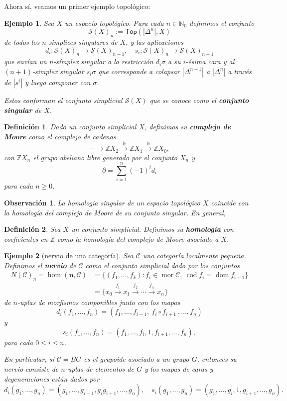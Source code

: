 \documentclass[11pt]{report}
\theoremstyle{colored}
\newtheorem{definition}{Definición}[section]
\newtheorem{remark}{Observación}[section]
\newtheorem{example}{Ejemplo}[section]
\newcommand{\N}{\mathbb{N}}
\newcommand{\Z}{\mathbb{Z}}
\newcommand{\cat}[1]{\mathsf{#1}}
\renewcommand{\ss}[1]{\Delta^{#1}}
\begin{document}
Ahora sí, veamos un primer ejemplo topológico:

\begin{example} Sea $X$ un espacio topológico. Para cada $n \in \N_0$ definimos el conjunto
\[
\mathcal{S}(X)_n := \cat{Top}(|\ss{n}|,X)
\]
de todos los $n$-simplices singulares de $X$, y las aplicaciones 
\[
d_i : \mathcal{S}(X)_n \to \mathcal{S}(X)_{n-1}, \quad
s_i : \mathcal{S}(X)_n \to \mathcal{S}(X)_{n+1}
\]
que envían un $n$-símplex singular a la restricción $d_i\sigma$ a su $i$-ésima cara y al $(n+1)$-simplex singular $s_i\sigma$ que corresponde a colapsar $|\ss{n+1}|$ a $|\ss{n}|$ a través de $|s^i|$ y luego componer con $\sigma$.

Estos conforman el conjunto simplicial $\mathcal{S}(X)$ que se conoce como el \textbf{conjunto singular} de $X$.
\end{example}

\begin{definition} Dado un conjunto simplicial $X$, definimos su \textbf{complejo de Moore} como el complejo de cadenas
\[
\cdots \to \Z X_2 \xrightarrow{\partial} \Z X_1 \xrightarrow{\partial} \Z X_0,
\]
con $\Z X_n$ el grupo abeliano libre generado por el conjunto $X_n$ y 
\[
\partial = \sum_{i=1}^n(-1)^i d_i
\]
para cada $n \geq 0$.
\end{definition}

\begin{remark} La homología singular de un espacio topológico $X$ coincide con la homología del complejo de Moore de su conjunto singular. En general,
\end{remark}

\begin{definition} Sea $X$ un conjunto simplicial. Definimos su \textbf{homología} con coeficientes en $\Z$ como la homología del complejo de Moore asociado a $X$.
\end{definition}

\begin{example}[nervio de una categoría] Sea $\mathscr{C}$ una categoría localmente pequeña. Definimos el \textbf{nervio} de  $\mathscr{C}$ como el conjunto simplicial dado por los conjuntos
\begin{align*}
N(\mathscr{C})_n = \hom(\mathbf{n},\mathscr{C}) &= \{(f_1,\dots, f_k) : f_i \in \operatorname{mor} \mathscr{C}, \ \operatorname{cod} f_i = \operatorname{dom}f_{i+1}\}\\
& = \{x_0 \xrightarrow{f_1} x_1 \xrightarrow{f_2} \cdots \xrightarrow{f_n} x_n\}
\end{align*}
de $n$-uplas de morfismos componibles junto con los mapas 
\[
d_i(f_1, \dots, f_n) = (f_1, \dots,f_{i-1}, \ f_i \circ f_{i+1} \ ,\dots,f_n)
\]
y
\[
s_i(f_1, \dots, f_n) = (f_1, \dots, f_i, 1, f_{i+1},\dots,f_n),
\]
para cada $0 \leq i \leq n$. 

En particular, si $\mathscr{C} = BG$ es el grupoide asociado a un grupo $G$, entonces su nervio consiste de $n$-uplas de elementos de $G$ y los mapas de caras y degeneraciones están dados por
\[
d_i(g_1, \dots, g_n) = (g_1,\dots, g_{i-1},g_ig_{i+1},\dots,g_n), \quad s_i(g_1, \dots,g_n) = (g_1, \dots,g_i,1,g_{i+1},\dots,g_n).
\]
\end{example}
\end{document}
